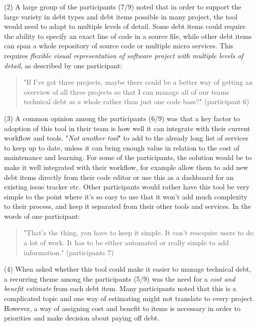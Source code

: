 (2) A large group of the participants (7/9) noted that in order to support the large variety in debt types and debt items possible in many project, the tool would need to adapt to multiple levels of detail.
Some debt items could require the ability to specify an exact line of code in a source file, while other debt items can span a whole repository of source code or multiple micro services.
This requires \textit{flexible visual representation of software project with multiple levels of detail}, as described by one participant:
\begin{quote}
  "If I've got three projects, maybe there could be a better way of getting an overview of all three projects so that I can manage all of our teams technical debt as a whole rather than just one code base?" (participant 6)
\end{quote}

(3) A common opinion among the participants (6/9) was that a key factor to adoption of this tool in their team is how well it can integrate with their current workflow and tools.
"\textit{Not another tool}" to add to the already long list of services to keep up to date, unless it can bring enough value in relation to the cost of maintenance and learning.
For some of the participants, the solution would be to make it well integrated with their workflow, for example allow them to add new debt items directly from their code editor or use this as a dashboard for an existing issue tracker etc.
Other participants would rather have this tool be very simple to the point where it's so easy to use that it won't add much complexity to their process, and keep it separated from their other tools and services. 
In the words of one participant:
\begin{quote}
  "That's the thing, you have to keep it simple. It can't reacquire users to do a lot of work. It has to be either automated or really simple to add information." (participants 7)
\end{quote}

(4) When asked whether this tool could make it easier to manage technical debt, a recurring theme among the participants (5/9) was the need for a \textit{cost and benefit estimate} from each debt item.
Many participants noted that this is a complicated topic and one way of estimating might not translate to every project.
However, a way of assigning cost and benefit to items is necessary in order to priorities and make decision about paying off debt.